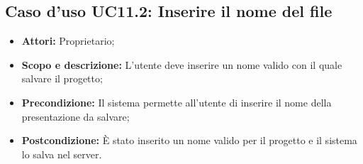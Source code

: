 \subsection{Caso d'uso UC11.2: Inserire il nome del file}
\begin{itemize}
	\item \textbf{Attori:} Proprietario;
	\item \textbf{Scopo e descrizione:} L'utente deve inserire un nome valido con il quale salvare il progetto;
	\item \textbf{Precondizione:} Il sistema permette all'utente di inserire il nome della presentazione da salvare;
	\item \textbf{Postcondizione:} È stato inserito un nome valido per il progetto e il sistema lo salva nel server.
\end{itemize}